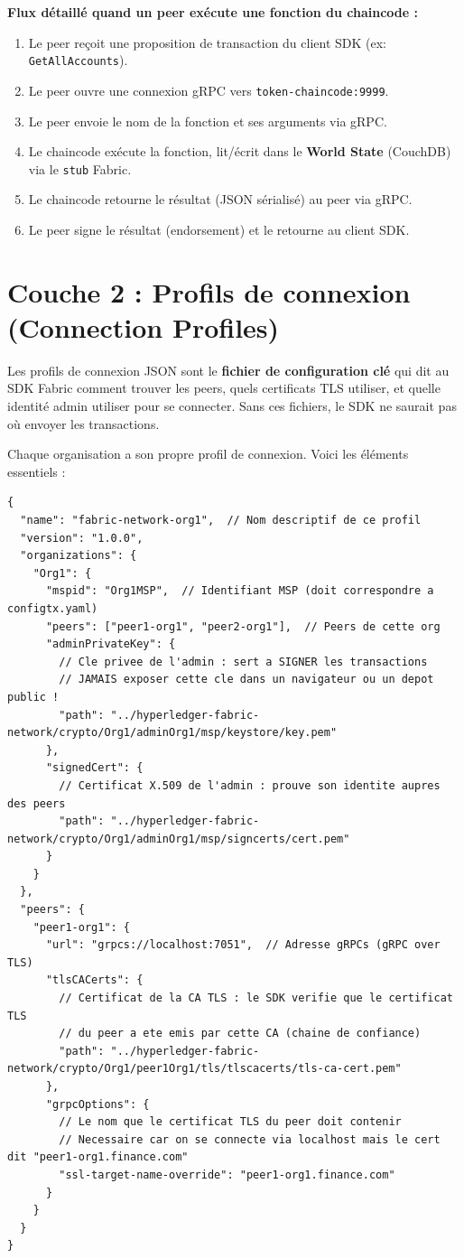 \documentclass[12pt,a4paper,twoside]{report}
\begin{document}
\textbf{Flux détaillé quand un peer exécute une fonction du chaincode :}
\begin{enumerate}
    \item Le peer reçoit une proposition de transaction du client SDK (ex: \texttt{GetAllAccounts}).
    \item Le peer ouvre une connexion gRPC vers \texttt{token-chaincode:9999}.
    \item Le peer envoie le nom de la fonction et ses arguments via gRPC.
    \item Le chaincode exécute la fonction, lit/écrit dans le \textbf{World State} (CouchDB) via le \texttt{stub} Fabric.
    \item Le chaincode retourne le résultat (JSON sérialisé) au peer via gRPC.
    \item Le peer signe le résultat (endorsement) et le retourne au client SDK.
\end{enumerate}

\section{Couche 2 : Profils de connexion (Connection Profiles)}

Les profils de connexion JSON sont le \textbf{fichier de configuration clé} qui dit au SDK Fabric comment trouver les peers, quels certificats TLS utiliser, et quelle identité admin utiliser pour se connecter. Sans ces fichiers, le SDK ne saurait pas où envoyer les transactions.

Chaque organisation a son propre profil de connexion. Voici les éléments essentiels :

\begin{lstlisting}[caption=Extrait annoté de connection-org1.json, basicstyle=\ttfamily\scriptsize]
{
  "name": "fabric-network-org1",  // Nom descriptif de ce profil
  "version": "1.0.0",
  "organizations": {
    "Org1": {
      "mspid": "Org1MSP",  // Identifiant MSP (doit correspondre a configtx.yaml)
      "peers": ["peer1-org1", "peer2-org1"],  // Peers de cette org
      "adminPrivateKey": {
        // Cle privee de l'admin : sert a SIGNER les transactions
        // JAMAIS exposer cette cle dans un navigateur ou un depot public !
        "path": "../hyperledger-fabric-network/crypto/Org1/adminOrg1/msp/keystore/key.pem"
      },
      "signedCert": {
        // Certificat X.509 de l'admin : prouve son identite aupres des peers
        "path": "../hyperledger-fabric-network/crypto/Org1/adminOrg1/msp/signcerts/cert.pem"
      }
    }
  },
  "peers": {
    "peer1-org1": {
      "url": "grpcs://localhost:7051",  // Adresse gRPCs (gRPC over TLS)
      "tlsCACerts": {
        // Certificat de la CA TLS : le SDK verifie que le certificat TLS
        // du peer a ete emis par cette CA (chaine de confiance)
        "path": "../hyperledger-fabric-network/crypto/Org1/peer1Org1/tls/tlscacerts/tls-ca-cert.pem"
      },
      "grpcOptions": {
        // Le nom que le certificat TLS du peer doit contenir
        // Necessaire car on se connecte via localhost mais le cert dit "peer1-org1.finance.com"
        "ssl-target-name-override": "peer1-org1.finance.com"
      }
    }
  }
}
\end{lstlisting}
\end{document}
